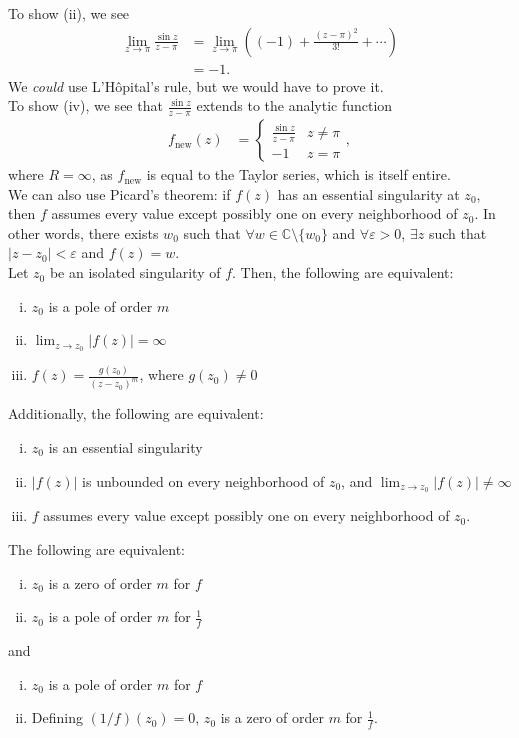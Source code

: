 \documentclass[10pt]{extarticle}
\newcommand{\C}{\mathbb{C}}
\begin{document}
  To show (ii), we see
  \begin{align*}
    \lim_{z\rightarrow \pi}\frac{\sin z}{z-\pi} &= \lim_{z\rightarrow \pi} \left((-1) + \frac{(z-\pi)^2}{3!} + \cdots\right)\\
                                                &= -1.
  \end{align*}
  We \textit{could} use L'Hôpital's rule, but we would have to prove it.\\

  To show (iv), we see that $\frac{\sin z}{z-\pi}$ extends to the analytic function
  \begin{align*}
    f_{\text{new}}(z) &= \begin{cases}
      \frac{\sin z}{z-\pi} & z\neq \pi\\
      -1 & z=\pi
    \end{cases},
  \end{align*}
  where $R = \infty$, as $f_{\text{new}}$ is equal to the Taylor series, which is itself entire.\\

  We can also use Picard's theorem: if $f(z)$ has an essential singularity at $z_0$, then $f$ assumes every value except possibly one on every neighborhood of $z_0$. In other words, there exists $w_0$ such that $\forall w\in \C\setminus \{w_0\}$ and $\forall \varepsilon > 0$, $\exists z$ such that $|z-z_0| < \varepsilon$ and $f(z) = w$.\\

  Let $z_0$  be an isolated singularity of $f$. Then, the following are equivalent:
  \begin{enumerate}[(i)]
    \item $z_0$ is a pole of order $m$
    \item $\lim_{z\rightarrow z_0}|f(z)| = \infty$
    \item $f(z) = \frac{g(z_0)}{(z-z_0)^m}$, where $g(z_0)\neq 0$
  \end{enumerate}
  Additionally, the following are equivalent:
  \begin{enumerate}[(i)]
    \item $z_0$ is an essential singularity
    \item $|f(z)|$ is unbounded on every neighborhood of $z_0$, and $\lim_{z\rightarrow z_0}|f(z)|\neq \infty$
    \item $f$ assumes every value except possibly one on every neighborhood of $z_0$.
  \end{enumerate}
  The following are equivalent:
  \begin{enumerate}[(i)]
    \item $z_0$ is a zero of order $m$ for $f$
    \item $z_0$ is a pole of order $m$ for $\frac{1}{f}$
  \end{enumerate}
  and
  \begin{enumerate}[(i)]
    \item $z_0$ is a pole of order $m$ for $f$
    \item Defining $(1/f)(z_0) = 0$, $z_0$ is a zero of order $m$ for $\frac{1}{f}$.
  \end{enumerate}
\end{document}
